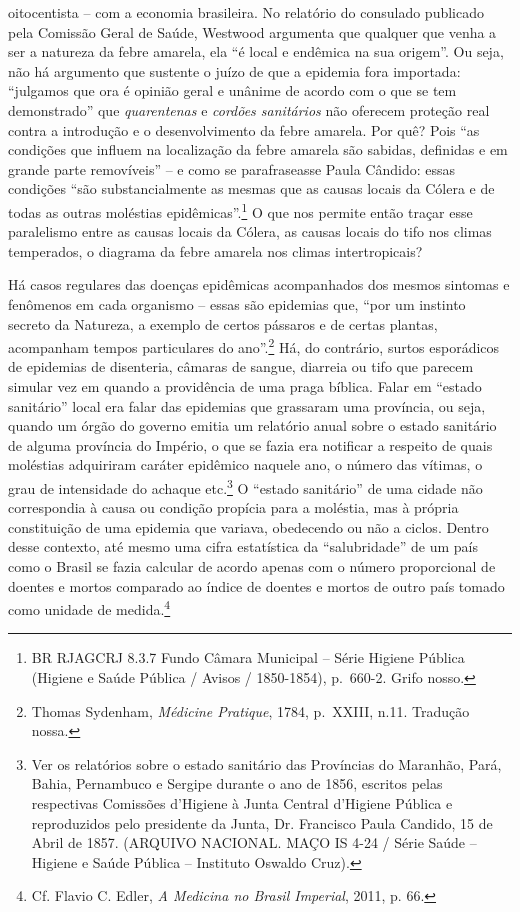 oitocentista -- com a economia brasileira. No relatório do consulado
publicado pela Comissão Geral de Saúde, Westwood argumenta que qualquer
que venha a ser a natureza da febre amarela, ela ``é local e endêmica na
sua origem''. Ou seja, não há argumento que sustente o juízo de que a
epidemia fora importada: ``julgamos que ora é opinião geral e unânime de
acordo com o que se tem demonstrado'' que \emph{quarentenas} e
\emph{cordões sanitários} não oferecem proteção real contra a introdução
e o desenvolvimento da febre amarela. Por quê? Pois ``as condições que
influem na localização da febre amarela são sabidas, definidas e em
grande parte removíveis'' -- e como se parafraseasse Paula Cândido:
essas condições ``são substancialmente as mesmas que as causas locais da
Cólera e de todas as outras moléstias epidêmicas''.\footnote{BR RJAGCRJ
  8.3.7 Fundo Câmara Municipal -- Série Higiene Pública (Higiene e Saúde
  Pública / Avisos / 1850-1854), p.~660-2. Grifo nosso.} O que nos
permite então traçar esse paralelismo entre as causas locais da Cólera,
as causas locais do tifo nos climas temperados, o diagrama da febre
amarela nos climas intertropicais?

Há casos regulares das doenças epidêmicas acompanhados dos mesmos
sintomas e fenômenos em cada organismo -- essas são epidemias que, ``por
um instinto secreto da Natureza, a exemplo de certos pássaros e de
certas plantas, acompanham tempos particulares do ano''.\footnote{Thomas
  Sydenham, \emph{Médicine Pratique}, 1784, p.~XXIII, n.11. Tradução
  nossa.} Há, do contrário, surtos esporádicos de epidemias de
disenteria, câmaras de sangue, diarreia ou tifo que parecem simular vez
em quando a providência de uma praga bíblica. Falar em ``estado
sanitário'' local era falar das epidemias que grassaram uma província,
ou seja, quando um órgão do governo emitia um relatório anual sobre o
estado sanitário de alguma província do Império, o que se fazia era
notificar a respeito de quais moléstias adquiriram caráter epidêmico
naquele ano, o número das vítimas, o grau de intensidade do achaque
etc.\footnote{Ver os relatórios sobre o estado sanitário das Províncias
  do Maranhão, Pará, Bahia, Pernambuco e Sergipe durante o ano de 1856,
  escritos pelas respectivas Comissões d'Higiene à Junta Central
  d'Higiene Pública e reproduzidos pelo presidente da Junta, Dr.
  Francisco Paula Candido, 15 de Abril de 1857. (ARQUIVO NACIONAL. MAÇO
  IS 4-24 / Série Saúde -- Higiene e Saúde Pública -- Instituto Oswaldo
  Cruz).} O ``estado sanitário'' de uma cidade não correspondia à causa
ou condição propícia para a moléstia, mas à própria constituição de uma
epidemia que variava, obedecendo ou não a ciclos. Dentro desse contexto,
até mesmo uma cifra estatística da ``salubridade'' de um país como o
Brasil se fazia calcular de acordo apenas com o número proporcional de
doentes e mortos comparado ao índice de doentes e mortos de outro país
tomado como unidade de medida.\footnote{Cf. Flavio C. Edler, \emph{A
  Medicina no Brasil Imperial}, 2011, p. 66.}

